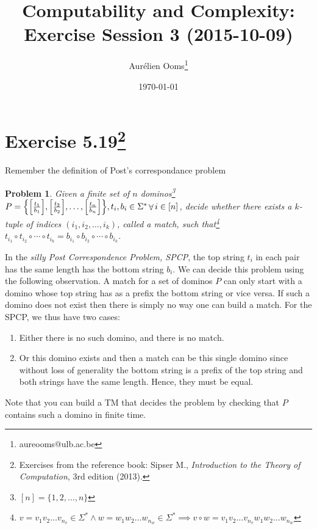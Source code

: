 \documentclass{article}
\title{Computability and Complexity:\\Exercise Session 3 (2015-10-09)}
\author{Aurélien Ooms\footnote{aureooms@ulb.ac.be}}
\date{\today}
\newcommand{\problemname}{Problem}
\newtheorem{problem}{\problemname}
\DeclareMathOperator{\Forall}{\forall}
\begin{document}
\maketitle
\tableofcontents

\section{Exercise 5.19\footnote{Exercises from the reference book: Sipser M.,
\emph{Introduction to the Theory of Computation}, 3rd edition (2013).}}

Remember the definition of Post's correspondance problem
\begin{problem}\label{PCP}
	Given a finite set of \(n\) dominos\footnote{\([n] = \{1,2,\ldots,n\}\)}
	\(P = \mleft\{ \mleft[\frac{t_1}{b_1}\mright] , \mleft[\frac{t_2}{b_2}\mright] , \ldots
			, \mleft[\frac{t_n}{b_n}\mright]\mright\}, t_i, b_i \in \Sigma^*
				\Forall i \in [n]\), decide
	whether there exists a \(k\)-tuple of indices \((i_1,i_2,\ldots,i_k)\),
	called a match,
	such that\footnote{\(v = v_1 v_2 \ldots v_{n_v} \in \Sigma^* \land w = w_1 w_2 \ldots
			w_{n_w} \in \Sigma^* \implies v \circ w = v_1 v_2 \ldots v_{n_v} w_1 w_2
	\ldots w_{n_w}\) }
	\(t_{i_1} \circ t_{i_2} \circ \cdots \circ t_{i_k} =
	b_{i_1} \circ b_{i_2} \circ \cdots \circ b_{i_k} \).
\end{problem}

In the \emph{silly Post Correspondence Problem, SPCP}, the top string \(t_i\)
in each pair has the same length has the bottom string \(b_i\). We can decide
this problem using the following observation.
A match for a set of dominos \(P\) can only start with a domino whose top
string has as a prefix the bottom string or vice versa. If such a domino does
not exist then there is simply no way one can build a match.
For the SPCP, we thus have two cases:
\begin{enumerate}
	\item Either there is no such domino, and there is no match.
	\item Or this domino exists and then a match can be this single domino
		since without loss of generality the bottom string is a prefix of the
		top string and both strings have the same length. Hence, they must be
		equal.
\end{enumerate}
Note that you can build a TM that decides the problem by checking that \(P\)
contains such a domino in finite time.
\end{document}
